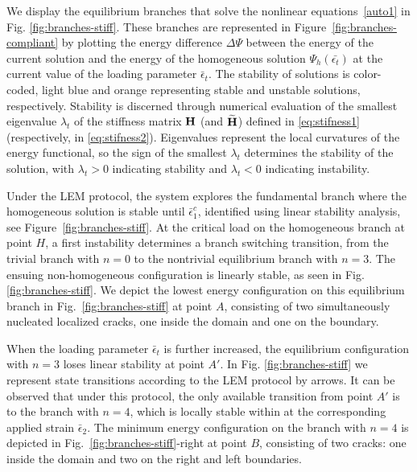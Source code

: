 We display the equilibrium branches that solve the nonlinear equations~\ref{auto1} in Fig. \ref{fig:branches-stiff}. These branches are represented in Figure~\ref{fig:branches-compliant} by plotting the energy difference $\Delta \Psi$ between the energy of the current solution and the energy of the homogeneous solution $\Psi_h(\bar{\epsilon_t})$ at the current value of the loading parameter $\bar\epsilon_t$. The stability of solutions is color-coded, light blue and orange representing stable and unstable solutions, respectively. Stability is discerned through numerical evaluation of the smallest eigenvalue $\lambda_t$ of the stiffness matrix $\mathbf{H}$ (and $\widetilde{\mathbf{H}}$) defined in \eqref{eq:stifness1} (respectively, in \eqref{eq:stifness2}). Eigenvalues represent the local curvatures of the energy functional, so the sign of the smallest  $\lambda_t$ determines the stability of the solution, with $\lambda_t > 0$ indicating stability and $\lambda_t < 0$ indicating instability.

Under the LEM protocol, the system explores the fundamental branch where the homogeneous solution is stable until 
$\bar\epsilon^c_1$, identified using linear stability analysis, see Figure~\ref{fig:branches-stiff}. At the critical load on the homogeneous branch  at point $H$, a first instability determines a branch switching transition, from the trivial branch with $n = 0$ to the nontrivial equilibrium branch with $n = 3$. The ensuing non-homogeneous configuration is linearly stable, as seen in Fig. \ref{fig:branches-stiff}. We depict the lowest energy configuration on this equilibrium branch in Fig.~\ref{fig:branches-stiff} at point $A$, consisting of two simultaneously nucleated localized cracks, one inside the domain and one on the boundary. 

When the loading parameter $\bar{\epsilon}_t$ is further increased, the equilibrium configuration with $n=3$ loses linear stability at point $A'$. In Fig. \ref{fig:branches-stiff} we represent state transitions according to the LEM protocol by arrows. It can be observed that under this protocol, the only available transition from point $A'$ is to the branch with $n=4$, which is locally stable within at the corresponding applied strain $\bar{\epsilon}_2$. The minimum energy configuration on the branch with $n=4$ is depicted in Fig.~\ref{fig:branches-stiff}-right at point $B$, consisting of two cracks: one inside the domain and two on the right and left boundaries.


